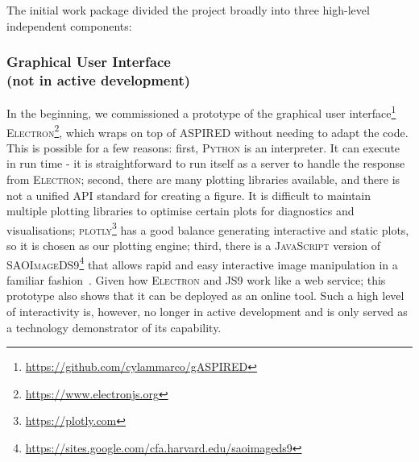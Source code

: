 \documentclass[twocolumn, linenumbers]{aastex631}
\begin{document}
The initial work package divided the project broadly into three high-level
independent components:

\subsubsection*{Graphical User Interface\\(not in active development)}
In the beginning, we commissioned a prototype of the graphical user
interface\footnote{\url{https://github.com/cylammarco/gASPIRED}}
\textsc{Electron}\footnote{\url{https://www.electronjs.org}}, which wraps on
top of \textsc{ASPIRED} without needing to adapt the code. This is
possible for a few reasons: first, \textsc{Python} is an interpreter. It can
execute in run time - it is straightforward to run itself as a server to handle
the response from \textsc{Electron}; second, there are many plotting libraries
available, and there is not a unified API standard for creating a figure. It
is difficult to maintain multiple plotting libraries to optimise certain plots
for diagnostics and visualisations; \textsc{plotly}\footnote{\url{https://plotly.com}}
has a good balance generating interactive and static plots, so it is chosen as
our plotting engine; third, there is a \textsc{JavaScript} version of
\textsc{SAOImageDS9}\footnote{\url{https://sites.google.com/cfa.harvard.edu/saoimageds9}}
that allows rapid and easy interactive image manipulation in a familiar
fashion~\citep{2003ASPC..295..489J, eric_mandel_2022_6675771}. Given how
\textsc{Electron} and \textsc{JS9} work like a web service; this prototype also
shows that it can  be deployed as an online tool. Such a high level of
interactivity is, however, no longer in active development and is only served
as a technology demonstrator of its capability.

\end{document}
